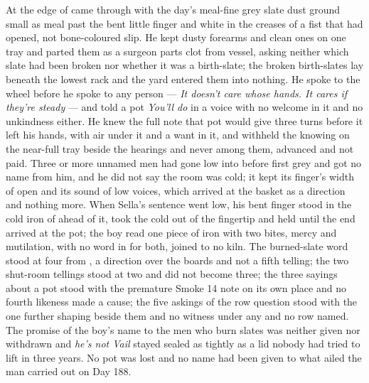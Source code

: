 At the edge of   came through with the day's meal-fine grey slate dust ground small as meal past the bent little finger and white in the creases of a fist that had opened, not bone-coloured slip. He kept dusty forearms and clean ones on one tray and parted them as a surgeon parts clot from vessel, asking neither which slate had been broken nor whether it was a birth-slate; the broken birth-slates lay beneath the lowest rack and the yard entered them into nothing. He spoke to the wheel before he spoke to any person --- \emph{It doesn't care whose hands. It cares if they're steady} --- and told a pot \emph{You'll do} in a voice with no welcome in it and no unkindness either. He knew the full note that pot would give three turns before it left his hands, with air under it and a want in it, and withheld the knowing on the near-full tray beside the hearings and never among them, advanced and not paid. Three or more unnamed men had gone low into  before first grey and got no name from him, and he did not say the room was cold; it kept its finger's width of open and its sound of low voices, which arrived at the basket as a direction and nothing more. When Sella's sentence went low, his bent finger stood in the cold iron of  ahead of it, took the cold out of the fingertip and held until the end arrived at the pot; the boy read one piece of iron with two bites, mercy and mutilation, with no word in  for both, joined to no kiln. The burned-slate word stood at four from , a direction over the boards and not a fifth telling; the two shut-room tellings stood at two and did not become three; the three sayings about a pot stood with the premature Smoke 14 note on its own place and no fourth likeness made a cause; the five askings of the row question stood with the one further shaping beside them and no witness under any and no row named. The promise of the boy's name to the men who burn slates was neither given nor withdrawn and \emph{he's not Vail} stayed sealed as tightly as a lid nobody had tried to lift in three years. No pot was lost and no name had been given to what ailed the man carried out on Day 188.

\scenebreak

